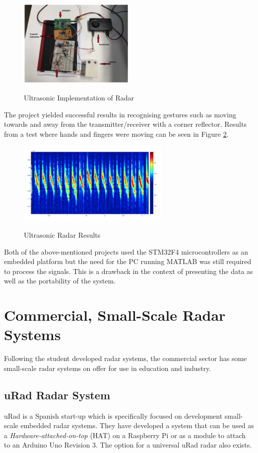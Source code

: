 \begin{figure}[h!]
    \centering
    \includegraphics[width = 0.5\textwidth]{images/ultrasonic.pdf}
    \caption{Ultrasonic Implementation of Radar}\label{fig:ultrasonic}\cite{ali_yasin_design_2018}
\end{figure}

The project yielded successful results in recognising gestures such as moving towards and away from the transmitter/receiver with a corner reflector. Results from a test where hands and fingers were moving can be seen in Figure \ref{fig:aliresults}.
\begin{figure}[h!]
    \centering
    \includegraphics[width = 0.65\textwidth]{images/handsfingers.pdf}
    \caption{Ultrasonic Radar Results}\label{fig:aliresults}\cite{ali_yasin_design_2018}
\end{figure}

Both of the above-mentioned projects used the STM32F4 microcontrollers as an embedded platform but the need for the PC running MATLAB was still required to process the signals. This is a drawback in the context of presenting the data as well as the portability of the system.

\section{Commercial, Small-Scale Radar Systems}
Following the student developed radar systems, the commercial sector has some small-scale radar systems on offer for use in education and industry.
\subsection{uRad Radar System}
uRad is a Spanish start-up which is specifically focused on development small-scale embedded radar systems. They have developed a system that can be used as a \textit{Hardware-attached-on-top} (HAT) on a Raspberry Pi or as a module to attach to an Arduino Uno Revision 3. The option for a universal uRad radar also exists.

